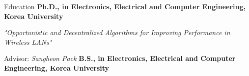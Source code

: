 \begin{rubric}{Education}
\entry*[2010 -- 2017]%
	\textbf{Ph.D., in Electronics, Electrical and Computer Engineering, Korea University}
	\par \emph{"Opportunistic and Decentralized Algorithms for Improving Performance in Wireless LANs"}
        \par Advisor: \emph{Sangheon Pack}
\entry*[2003 -- 2006]%
	\textbf{B.S., in Electronics, Electrical and Computer Engineering, Korea University} \par
\end{rubric}